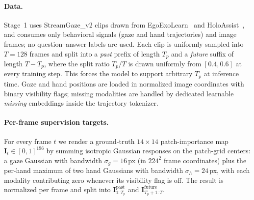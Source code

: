 \paragraph{Data.}
Stage~1 uses StreamGaze\_v2 clips drawn from
EgoExoLearn~\citep{huang2024egoexolearn} and
HoloAssist~\citep{wang2023holoassistegocentrichumaninteraction}, and
consumes only behavioral signals (gaze and hand trajectories) and image
frames; no question--answer labels are used. Each clip is uniformly sampled
into $T{=}128$ frames and split into a \emph{past} prefix of length $T_p$
and a \emph{future} suffix of length $T-T_p$, where the split ratio
$T_p/T$ is drawn uniformly from $[0.4, 0.6]$ at every training step. This
forces the model to support arbitrary $T_p$ at inference time. Gaze and
hand positions are loaded in normalized image coordinates with binary
visibility flags; missing modalities are handled by dedicated learnable
\emph{missing} embeddings inside the trajectory tokenizer.

\paragraph{Per-frame supervision targets.}
For every frame $t$ we render a ground-truth $14{\times}14$ patch-importance
map $\mathbf{I}_t \in [0,1]^{196}$ by summing isotropic Gaussian responses
on the patch-grid centers: a gaze Gaussian with bandwidth $\sigma_g{=}16$\,px
(in $224^2$ frame coordinates) plus the per-hand maximum of two hand
Gaussians with bandwidth $\sigma_h{=}24$\,px, with each modality contributing
zero whenever its visibility flag is off. The result is normalized per
frame and split into $\mathbf{I}^{\text{past}}_{1:T_p}$ and
$\mathbf{I}^{\text{future}}_{T_p+1:T}$.

